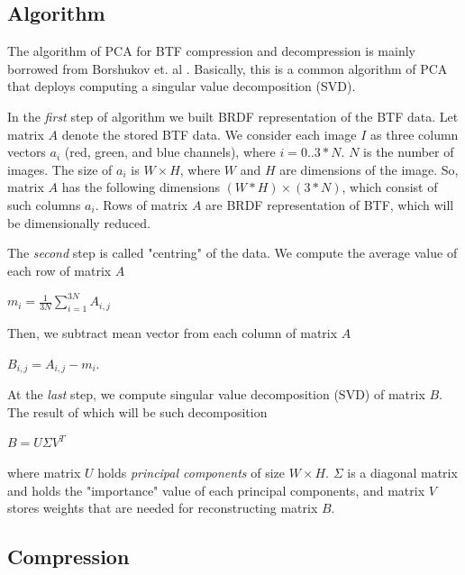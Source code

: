 \subsection{Algorithm}
\label{section:algorithm_step}
The algorithm of PCA for BTF compression and decompression is mainly borrowed from  Borshukov et. al \cite[Ch.\ 15]{gpu_gems}.
 Basically, this is a common algorithm of PCA that deploys computing a singular value decomposition (SVD).

In the \emph{first} step of algorithm we built BRDF representation of the BTF data.
Let matrix $A$ denote the stored BTF data.
We consider each image $I$ as three column vectors $a_{i}$ (red, green, and blue channels), where $i=0..3*N$. $N$ is the number of images.
The size of $a_{i}$ is $W\times H$, where $W$ and $H$ are dimensions of the image.
So, matrix $A$ has the following dimensions $(W*H)\times(3*N)$, which consist of such columns $a_{i}$.
Rows of matrix $A$ are BRDF representation of BTF, which will be dimensionally reduced.

The  \emph{second} step is called "centring" of the data. We compute the average value of each row of matrix $A$

{\centering $m_i=\frac{1}{3N}\sum_{i=1}^{3N}A_{i,j}$ \\}

Then, we subtract mean vector from each column of matrix $A$

{\centering $B_{i,j}=A_{i,j}-m_i.$ \\}

At the \emph{last} step, we compute singular value decomposition (SVD) of matrix $B$. The result of which will be such decomposition

{\centering $B=U\Sigma V^{T}$ \\}

where matrix $U$ holds \emph{principal components} of size $W\times H$. $\Sigma$ is a diagonal matrix and holds the "importance" value of each principal components, and
matrix $V$ stores weights that are needed for reconstructing matrix $B$.

\subsection{Compression}
\label{section:compression}




